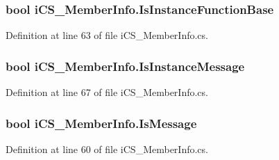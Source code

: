 \hypertarget{classi_c_s___member_info_af466ca174d8c124bd8773e366438dfcd}{
\subsubsection[{Is\+Instance\+Function\+Base}]{\setlength{\rightskip}{0pt plus 5cm}bool i\+C\+S\+\_\+\+Member\+Info.\+Is\+Instance\+Function\+Base\hspace{0.3cm}{\ttfamily [get]}}}\label{classi_c_s___member_info_af466ca174d8c124bd8773e366438dfcd}


Definition at line 63 of file i\+C\+S\+\_\+\+Member\+Info.\+cs.

\hypertarget{classi_c_s___member_info_af162be21796a67bcc04c12247c9e67cd}{
\subsubsection[{Is\+Instance\+Message}]{\setlength{\rightskip}{0pt plus 5cm}bool i\+C\+S\+\_\+\+Member\+Info.\+Is\+Instance\+Message\hspace{0.3cm}{\ttfamily [get]}}}\label{classi_c_s___member_info_af162be21796a67bcc04c12247c9e67cd}


Definition at line 67 of file i\+C\+S\+\_\+\+Member\+Info.\+cs.

\hypertarget{classi_c_s___member_info_acaa4b0857e422a2bbfcb473749255948}{
\subsubsection[{Is\+Message}]{\setlength{\rightskip}{0pt plus 5cm}bool i\+C\+S\+\_\+\+Member\+Info.\+Is\+Message\hspace{0.3cm}{\ttfamily [get]}}}\label{classi_c_s___member_info_acaa4b0857e422a2bbfcb473749255948}


Definition at line 60 of file i\+C\+S\+\_\+\+Member\+Info.\+cs.

